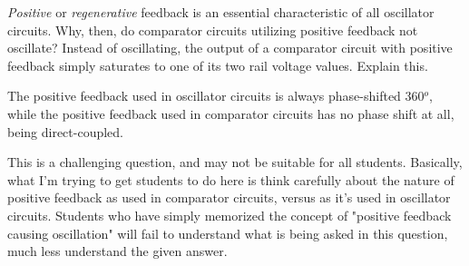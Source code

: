 

{\it Positive} or {\it regenerative} feedback is an essential characteristic of all oscillator circuits.  Why, then, do comparator circuits utilizing positive feedback not oscillate?  Instead of oscillating, the output of a comparator circuit with positive feedback simply saturates to one of its two rail voltage values.  Explain this.







The positive feedback used in oscillator circuits is always phase-shifted 360$^{o}$, while the positive feedback used in comparator circuits has no phase shift at all, being direct-coupled.







This is a challenging question, and may not be suitable for all students.  Basically, what I'm trying to get students to do here is think carefully about the nature of positive feedback as used in comparator circuits, versus as it's used in oscillator circuits.  Students who have simply memorized the concept of "positive feedback causing oscillation" will fail to understand what is being asked in this question, much less understand the given answer.



